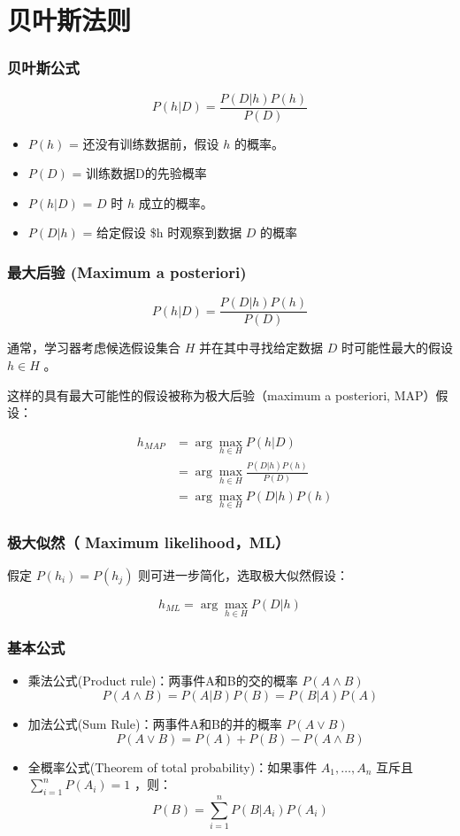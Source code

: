 \documentclass{beamer}
\begin{document}
\section{贝叶斯法则}
\label{sec-2}
\begin{frame}
\frametitle{贝叶斯公式}
\label{sec-2-1}


\[ P(h|D) = \frac{P(D|h) P(h)}{P(D)} \]


\begin{itemize}
\item $P(h)$ = 还没有训练数据前，假设 $h$ 的概率。
\item $P(D)$ = 训练数据D的先验概率
\item $P(h|D)$ = $D$ 时 $h$ 成立的概率。
\item $P(D|h)$ = 给定假设 \$h 时观察到数据 $D$ 的概率
\end{itemize}
\end{frame}
\begin{frame}
\frametitle{最大后验 (Maximum a posteriori)}
\label{sec-2-2}


\[ P(h|D) = \frac{P(D|h) P(h)}{P(D)} \]

通常，学习器考虑候选假设集合 $H$ 并在其中寻找给定数据 $D$ 时可能性最大的假设 $h\in H$ 。

这样的具有最大可能性的假设被称为极大后验（maximum a posteriori, MAP）假设：

\begin{eqnarray}
& h_{MAP} & = \arg \max_{h \in H} P(h|D)\nonumber \\
& & = \arg \max_{h \in H} \frac{P(D|h) P(h)}{P(D)} \nonumber \\
& & = \arg \max_{h \in H}P(D|h) P(h) \nonumber
\end{eqnarray}
\end{frame}
\begin{frame}
\frametitle{极大似然（ Maximum likelihood，ML）}
\label{sec-2-3}


假定 $P(h_{i})=P(h_{j})$ 则可进一步简化，选取极大似然假设：

$$h_{ML}=\arg \max_{h \in H}P(D|h)$$
\end{frame}
\begin{frame}
\frametitle{基本公式}
\label{sec-2-4}


\begin{itemize}
\item 乘法公式(Product rule)：两事件A和B的交的概率 $P(A \land B)$
  $$P(A \land B) = P(A|B) P(B) = P(B|A) P(A)$$
\item 加法公式(Sum Rule)：两事件A和B的并的概率 $P(A\lor B)$
  $$P(A \lor B) = P(A) + P(B) - P(A \land B)$$
\item 全概率公式(Theorem of total probability)：如果事件 $A_{1}, \ldots, A_{n}$ 互斥且 $\sum_{i = 1}^{n} P(A_{i}) = 1$ ，则：
  $$P(B) = \sum_{i = 1}^{n} P(B|A_{i}) P(A_{i})$$
\end{itemize}
\end{frame}
\end{document}
